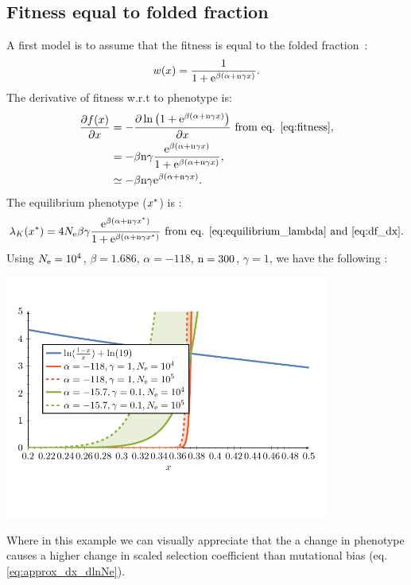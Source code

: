 \subsection{Fitness equal to folded fraction}
A first model is to assume that the fitness is equal to the folded fraction~\citep{Goldstein2013}:
\begin{gather}
 w (x) = \frac{1}{1 + \mathrm{e}^{\beta(\alpha + \text{n} \gamma x)}}. \label{eq:fitness}
\end{gather}
The derivative of fitness w.r.t to phenotype is:
\begin{align}
\frac{\partial  f (x)}{\partial x}  & = - \frac{\partial \ln \left( 1 + \mathrm{e}^{\beta(\alpha + \text{n} \gamma x)} \right)}{\partial x} \text{ from eq. \ref{eq:fitness}}, \\
& = - \beta \text{n} \gamma \frac{\mathrm{e}^{\beta(\alpha + \text{n} \gamma x)}}{1 + \mathrm{e}^{\beta(\alpha + \text{n} \gamma x)}} \label{eq:df_dx},\\
& \simeq - \beta \text{n} \gamma \mathrm{e}^{\beta(\alpha + \text{n} \gamma x)}.
\end{align}
The equilibrium phenotype ($x^{*}$) is :
\begin{gather}
\lambda_{K}(x^{*}) = 4N_{\mathrm{e}} \beta \gamma \frac{\mathrm{e}^{\beta(\alpha + \text{n} \gamma x^{*})}}{1 + \mathrm{e}^{\beta(\alpha + \text{n} \gamma x^{*})}}  \text{ from eq. \ref{eq:equilibrium_lambda} and \ref{eq:df_dx}}.
\end{gather}
Using $N_{\mathrm{e}}=10^4$, $\beta=1.686$, $\alpha = -118$, $\text{n}=300$, $\gamma=1$, we have the following :
\begin{center}
\includegraphics[width=0.8\textwidth, page=4] {analytical-relaxation}
\end{center}
Where in this example we can visually appreciate that the a change in phenotype causes a higher change in scaled selection coefficient than mutational bias (eq. \ref{eq:approx_dx_dlnNe}).
